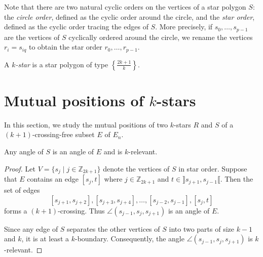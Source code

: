 \documentclass[12pt]{amsart}
\begin{document}
Note that there are two natural cyclic orders on the vertices of a star polygon $S$: the \emph{circle order}, defined as the cyclic order around the circle, and the \emph{star order}, defined as the cyclic order tracing the edges of $S$. More precisely, if $s_0,\ldots,s_{p-1}$ are the vertices of $S$ cyclically ordered around the circle, we rename the vertices $r_i=s_{iq}$ to obtain the star order $r_0,\ldots,r_{p-1}$.


\begin{definition}
A \emph{$k$-star} is a star polygon of type $\left\{\frac{2k+1}{k}\right\}$.
\end{definition}





\section{Mutual positions of $k$-stars}\label{sectionstars}

In this section, we study the mutual positions of two $k$-stars $R$ and $S$ of a $(k+1)$-crossing-free subset $E$ of $E_n$.

\begin{lemma}\label{starangles}
Any angle of $S$ is an angle of $E$ and is $k$-relevant.
\end{lemma}

\begin{proof}
Let $V=\{s_j\;|\; j\in\mathbb{Z}_{2k+1}\}$ denote the vertices of $S$ in star order.
Suppose that $E$ contains an edge $[s_j,t]$ where $j\in\mathbb{Z}_{2k+1}$ and $t\in\rrbracket s_{j+1},s_{j-1}\llbracket$. Then the set of edges $$[s_{j+1},s_{j+2}],[s_{j+3},s_{j+4}],\ldots,[s_{j-2},s_{j-1}],[s_j,t]$$ forms a $(k+1)$-crossing. Thus $\angle(s_{j-1},s_j,s_{j+1})$ is an angle of $E$.

Since any edge of $S$ separates the other vertices of $S$ into two parts of size $k-1$ and $k$, it is at least a $k$-boundary. Consequently, the angle $\angle(s_{j-1},s_j,s_{j+1})$ is $k$-relevant.
\end{proof}
\end{document}
